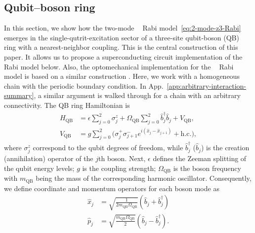 \documentclass[reprint, aps, prx, amsmath, amssymb, longbibliography, superscriptaddress]{revtex4-2}
\DeclareMathOperator{\Zthree}{\mathbb{Z}_3}
\begin{document}
\subsection{Qubit--boson ring}
\label{sec:physical-implementation}

In this section, we show how the two-mode $\Zthree$ Rabi model~\eqref{eq:2-mode-z3-Rabi} emerges
in the single-qutrit-excitation sector of a three-site qubit-boson (QB) ring with a
nearest-neighbor coupling. This is the central construction of this paper. It allows us to propose a superconducting circuit implementation of the $\Zthree$ Rabi model below. Also, the optomechanical implementation for the $\Zthree$ Rabi model is based on a similar construction \cite{sedov_chiral_2020}.  Here, we work with a homogeneous chain with the periodic boundary condition. In App.~\ref{app:arbitrary-interaction-summary}, a similar argument is walked through for a chain with an arbitrary connectivity. The QB ring Hamiltonian is
\begin{equation}
\label{eq:physical-hamiltonian}
  \begin{aligned}
    H_{\text{QB}} &= \epsilon \sum_{j=0}^{2} \sigma_j^z
      + \Omega_{\text{QB}} \sum_{j=0}^{2} \hat b_j^{\dagger} \hat b_j
      + V_{\text{QB}},
      \\
    V_{\text{QB}} &= g \sum_{j=0}^{2}
      \bigl( \sigma_j^{+} \sigma_{j+1}^{-}
      e^{ i ( \hat x_j - \hat x_{j+1} ) } + \text{h.c.} \bigr),
  \end{aligned}
\end{equation}
where $\sigma_j^z$ correspond to the qubit degrees of freedom, while $\hat b_j^{\dagger}$ ($\hat b_j$) is the creation (annihilation) operator of the $j$th boson. Next, $\epsilon$ defines the Zeeman splitting of the qubit energy levels; $g$ is the coupling strength; $\Omega_{\text{QB}}$ is the boson frequency with $m_{\text{QB}}$  being the mass of the corresponding harmonic oscillator. Consequently, we define coordinate and momentum operators for each boson mode as
\begin{align}
    \hat x_j &= \sqrt{\frac{1}{2 m_{\text{QB}} \Omega_{\text{QB}}}}\left(\hat b_j + \hat b_j^{\dagger}\right) \\
    \hat p_j &= \sqrt{\frac{m_{\text{QB}} \Omega_{\text{QB}}}{2 }}\left(\hat b_j - \hat b_j^{\dagger}\right).
\end{align}

\end{document}
